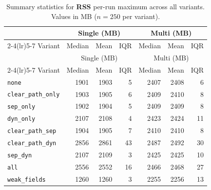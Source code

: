\begin{longtable}{l rrr rrr}
\caption[Total process RSS summary statistics]{Summary statistics for \textbf{RSS} per-run maximum across all variants. Values in MB ($n=250$ per variant).}\label{tab:stats-memory-rss} \\
\toprule
 & \multicolumn{3}{c}{Single (MB)} & \multicolumn{3}{c}{Multi (MB)} \\
\cmidrule(lr){2-4}\cmidrule(lr){5-7}
Variant & Median & Mean & IQR & Median & Mean & IQR \\
\midrule
\endfirsthead
\toprule
 & \multicolumn{3}{c}{Single (MB)} & \multicolumn{3}{c}{Multi (MB)} \\
\cmidrule(lr){2-4}\cmidrule(lr){5-7}
Variant & Median & Mean & IQR & Median & Mean & IQR \\
\midrule
\endhead
\bottomrule
\endfoot
\texttt{none} & 1901 & 1903 & 5 & 2407 & 2408 & 6 \\
\texttt{clear\_path\_only} & 1903 & 1905 & 6 & 2409 & 2410 & 8 \\
\texttt{sep\_only} & 1902 & 1904 & 5 & 2409 & 2409 & 8 \\
\texttt{dyn\_only} & 2107 & 2108 & 4 & 2423 & 2424 & 11 \\
\texttt{clear\_path\_sep} & 1904 & 1905 & 7 & 2410 & 2410 & 8 \\
\texttt{clear\_path\_dyn} & 2856 & 2861 & 43 & 2487 & 2492 & 30 \\
\texttt{sep\_dyn} & 2107 & 2109 & 3 & 2425 & 2425 & 10 \\
\texttt{all} & 2556 & 2552 & 16 & 2466 & 2468 & 27 \\
\texttt{weak\_fields} & 1260 & 1260 & 3 & 2255 & 2256 & 13 \\
\end{longtable}
